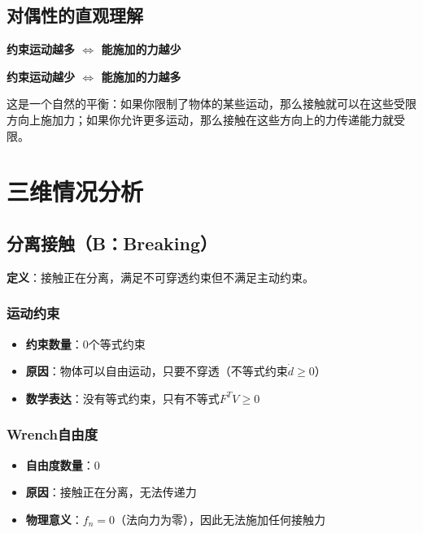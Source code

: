 \documentclass[12pt,a4paper]{article}
\begin{document}
\subsection{对偶性的直观理解}

\begin{center}
\textbf{约束运动越多 $\Leftrightarrow$ 能施加的力越少}
\end{center}

\begin{center}
\textbf{约束运动越少 $\Leftrightarrow$ 能施加的力越多}
\end{center}

这是一个自然的平衡：如果你限制了物体的某些运动，那么接触就可以在这些受限方向上施加力；如果你允许更多运动，那么接触在这些方向上的力传递能力就受限。

\section{三维情况分析}

\subsection{分离接触（B：Breaking）}

\textbf{定义}：接触正在分离，满足不可穿透约束但不满足主动约束。

\subsubsection{运动约束}

\begin{itemize}
    \item \textbf{约束数量}：0个等式约束
    \item \textbf{原因}：物体可以自由运动，只要不穿透（不等式约束$\dot{d} \geq 0$）
    \item \textbf{数学表达}：没有等式约束，只有不等式$F^T V \geq 0$
\end{itemize}

\subsubsection{Wrench自由度}

\begin{itemize}
    \item \textbf{自由度数量}：0
    \item \textbf{原因}：接触正在分离，无法传递力
    \item \textbf{物理意义}：$f_n = 0$（法向力为零），因此无法施加任何接触力
\end{itemize}
\end{document}
